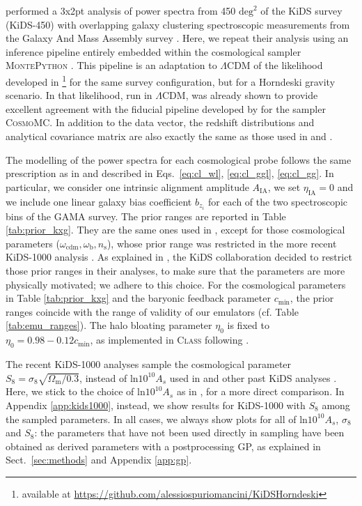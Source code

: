 \documentclass[fleqn,usenatbib]{mnras}
\begin{document}
\citet{vanUitert18} performed a 3x2pt analysis of power spectra from 450 $\mathrm{deg}^2$ of the KiDS survey (KiDS-450) with overlapping galaxy clustering spectroscopic measurements from the Galaxy And Mass Assembly survey \citep[GAMA,][]{Driver09, Driver11, Liske15}. Here, we repeat their analysis using an inference pipeline entirely embedded within the cosmological sampler \textsc{MontePython} \citep{Brinckmann18}. This pipeline is an adaptation to $\Lambda$CDM of the likelihood developed in \citet{SpurioMancini19}\footnote{available at \url{https://github.com/alessiospuriomancini/KiDSHorndeski}} for the same survey configuration, but for a Horndeski gravity scenario. In \citet{SpurioMancini19} that likelihood, run in $\Lambda$CDM, was already shown to provide excellent agreement with the fiducial pipeline developed by \citet{vanUitert18} for the sampler \textsc{CosmoMC}. In addition to the data vector, the redshift distributions and analytical covariance matrix are also exactly the same as those used in \citet{vanUitert18} and \citet{SpurioMancini19}. 

The modelling of the power spectra for each cosmological probe follows the same prescription as in \citet{vanUitert18, SpurioMancini19} and described in Eqs.~\ref{eq:cl_wl}, \ref{eq:cl_ggl}, \ref{eq:cl_gg}. In particular, we consider one intrinsic alignment amplitude $A_{\mathrm{IA}}$, we set $\eta_{\mathrm{IA}}=0$ and we include one linear galaxy bias coefficient $b_{z_i}$ for each of the two spectroscopic bins of the GAMA survey. The prior ranges are reported in Table \ref{tab:prior_kxg}. They are the same ones used in \citet{vanUitert18, SpurioMancini19}, except for those cosmological parameters ($\omega_{\mathrm{cdm}}, \omega_{\mathrm{b}}, n_{\mathrm{s}}$), whose prior range was restricted in the more recent KiDS-1000 analysis \citep{Asgari20, Heymans20, Joachimi20}. As explained in \citet{Joachimi20}, the KiDS collaboration decided to restrict those prior ranges in their analyses, to make sure that the parameters are more physically motivated; we adhere to this choice. For the cosmological parameters in Table \ref{tab:prior_kxg} and the baryonic feedback parameter $c_{\mathrm{min}}$, the prior ranges coincide with the range of validity of our emulators (cf. Table \ref{tab:emu_ranges}). The halo bloating parameter $\eta_0$ is fixed to $\eta_0 = 0.98 - 0.12 c_{\mathrm{min}}$, as implemented in \textsc{Class} following \citet{Mead15}.

The recent KiDS-1000 analyses sample the cosmological parameter $S_8 = \sigma_8 \sqrt{\Omega_{\mathrm{m}}/0.3}$, instead of $\mathrm{ln} 10^{10} A_s$ used in \citet{vanUitert18} and other past KiDS analyses \citep{Hildebrandt16, Kohlinger17, Hildebrandt20}. Here, we stick to the choice of $\mathrm{ln} 10^{10} A_s$ as in \citet{vanUitert18}, for a more direct comparison. In Appendix \ref{app:kids1000}, instead, we show results for KiDS-1000 with $S_8$ among the sampled parameters. In all cases, we always show plots for all of $\mathrm{ln} 10^{10} A_s$, $\sigma_8$ and $S_8$: the parameters that have not been used directly in sampling have been obtained as derived parameters with a postprocessing GP, as explained in Sect.~\ref{sec:methods} and Appendix \ref{app:gp}.
\end{document}
